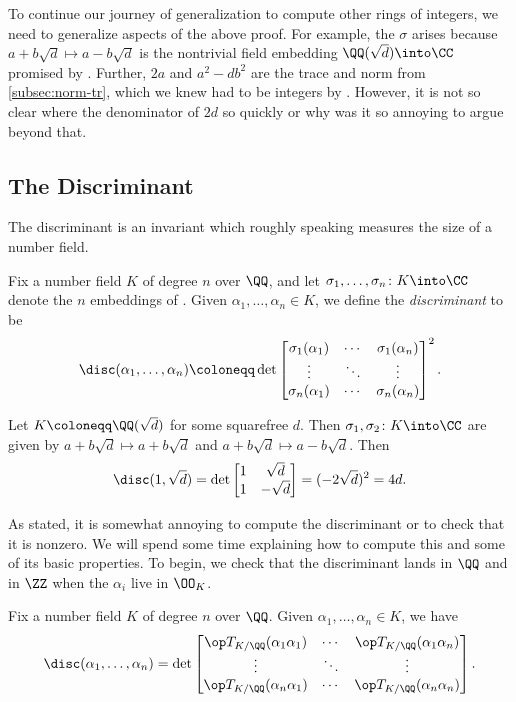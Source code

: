 \documentclass[../notes.tex]{subfiles}
\begin{document}
To continue our journey of generalization to compute other rings of integers, we need to generalize aspects of the above proof. For example, the $\sigma$ arises because $a+b\sqrt d\mapsto a-b\sqrt d$ is the nontrivial field embedding $\QQ(\sqrt d)\into\CC$ promised by . Further, $2a$ and $a^2-db^2$ are the trace and norm from \cref{subsec:norm-tr}, which we knew had to be integers by . However, it is not so clear where the denominator of $2d$ so quickly or why was it so annoying to argue beyond that.

\subsection{The Discriminant}
The discriminant is an invariant which roughly speaking measures the size of a number field.
\begin{definition}[discriminant]
	Fix a number field $K$ of degree $n$ over $\QQ$, and let $\sigma_1,\ldots,\sigma_n\colon K\into\CC$ denote the $n$ embeddings of . Given $\alpha_1,\ldots,\alpha_n\in K$, we define the \textit{discriminant} to be
	\[\disc(\alpha_1,\ldots,\alpha_n)\coloneqq\det\begin{bmatrix}
		\sigma_1(\alpha_1) & \cdots & \sigma_1(\alpha_n) \\
		\vdots & \ddots & \vdots \\
		\sigma_n(\alpha_1) & \cdots & \sigma_n(\alpha_n)
	\end{bmatrix}^2.\]
\end{definition}
\begin{example} \label{ex:quad-disc}
	Let $K\coloneqq\QQ(\sqrt d)$ for some squarefree $d$. Then $\sigma_1,\sigma_2\colon K\into\CC$ are given by $a+b\sqrt d\mapsto a+b\sqrt d$ and $a+b\sqrt d\mapsto a-b\sqrt d$. Then
	\[\disc(1,\sqrt d)=\det\begin{bmatrix}
		1 & \sqrt d \\
		1 & -\sqrt d
	\end{bmatrix}=(-2\sqrt d)^2=4d.\]
\end{example}
As stated, it is somewhat annoying to compute the discriminant or to check that it is nonzero. We will spend some time explaining how to compute this and some of its basic properties. To begin, we check that the discriminant lands in $\QQ$ and in $\ZZ$ when the $\alpha_i$ live in $\OO_K$.
\begin{lemma} \label{lem:disc-by-tr}
	Fix a number field $K$ of degree $n$ over $\QQ$. Given $\alpha_1,\ldots,\alpha_n\in K$, we have
	\[\disc(\alpha_1,\ldots,\alpha_n)=\det\begin{bmatrix}
		\op T_{K/\QQ}(\alpha_1\alpha_1) & \cdots & \op T_{K/\QQ}(\alpha_1\alpha_n) \\
		\vdots & \ddots & \vdots \\
		\op T_{K/\QQ}(\alpha_n\alpha_1) & \cdots & \op T_{K/\QQ}(\alpha_n\alpha_n)
	\end{bmatrix}.\]
\end{lemma}
\end{document}
